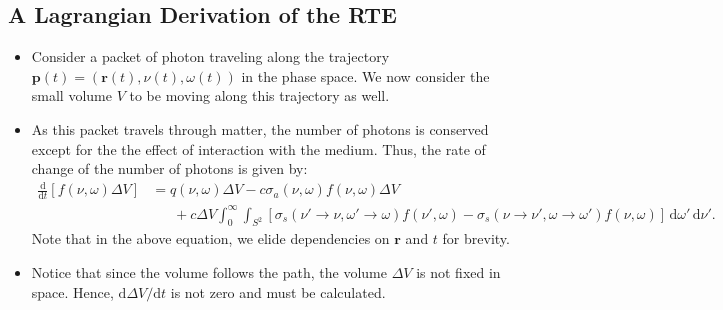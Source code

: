 \documentclass[10pt]{article}
\newcommand{\dee}{\mathrm{d}}
\newcommand{\ve}[1]{\mathbf{#1}}
\newcommand{\ra}{\rightarrow}
\begin{document}
  \subsection{A Lagrangian Derivation of the RTE}
  \begin{itemize}
    \item Consider a packet of photon traveling along the trajectory $\ve{p}(t) = (\ve{r}(t), \nu(t), \omega(t))$ in the phase space. We now consider the small volume $V$ to be moving along this trajectory as well.

    \item As this packet travels through matter, the number of photons is conserved except for the the effect of interaction with the medium. Thus, the rate of change of the number of photons is given by:
    \begin{align*}
      \frac{\dee}{\dee t} [f(\nu,\omega) \Delta V] 
      &= q(\nu,\omega) \Delta V - c \sigma_a(\nu,\omega) f(\nu, \omega) \Delta V \\
      &\phantom{\ =} + c \Delta V \int_{0}^\infty \int_{S^2} [\sigma_s(\nu' \ra \nu, \omega' \ra \omega) f(\nu', \omega) - \sigma_s(\nu \ra \nu', \omega \ra \omega') f(\nu, \omega) ]\, \dee \omega' \, \dee \nu'.
    \end{align*}
    Note that in the above equation, we elide dependencies on $\ve{r}$ and $t$ for brevity.

    \item Notice that since the volume follows the path, the volume $\Delta V$ is not fixed in space. Hence, $\dee \Delta V / \dee t$ is not zero and must be calculated.


\end{itemize}
\end{document}
